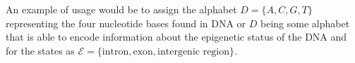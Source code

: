 An example of usage would be to assign the alphabet $D = \{A,C,G,T\}$ representing the four nucleotide bases found in DNA or $D$ being some alphabet that is able to encode information about the epigenetic status of the DNA and for the states as $\mathcal{E} = \{\text{intron}, \text{exon}, \text{intergenic region}\}$. 






